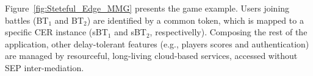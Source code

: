 


Figure~\ref{fig:Steteful_Edge_MMG} presents the game example. Users joining battles (BT$_1$ and BT$_2$) are identified by a common token, which is mapped to a specific CER instance (sBT$_1$ and sBT$_2$, respectivelly).
Composing the rest of the application, other delay-tolerant features (e.g., players scores and authentication) are managed by resourceful, long-living cloud-based services, accessed without SEP inter-mediation.  %

